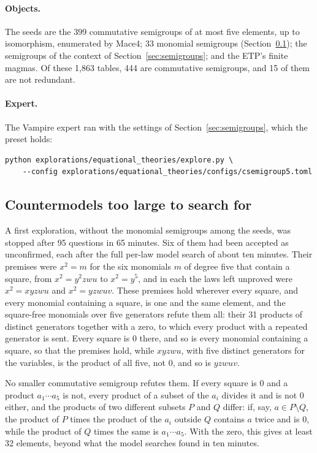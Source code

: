 \documentclass[11pt,a4paper]{article}
\theoremstyle{definition}
\theoremstyle{remark}
\begin{document}
\paragraph{Objects.} The seeds are the 399 commutative semigroups of at most five elements, up to isomorphism, enumerated by Mace4; 33 monomial semigroups (Section~\ref{sec:monomial}); the semigroups of the context of Section~\ref{sec:semigroups}; and the ETP's finite magmas. Of these 1,863 tables, 444 are commutative semigroups, and 15 of them are not redundant.

\paragraph{Expert.} The Vampire expert ran with the settings of Section~\ref{sec:semigroups}, which the preset  holds:
\begin{Verbatim}
python explorations/equational_theories/explore.py \
    --config explorations/equational_theories/configs/csemigroup5.toml
\end{Verbatim}

\subsection{Countermodels too large to search for}\label{sec:monomial}

A first exploration, without the monomial semigroups among the seeds, was stopped after 95 questions in 65 minutes. Six of them had been accepted as unconfirmed, each after the full per-law model search of about ten minutes. Their premises were $x^2 = m$ for the six monomials $m$ of degree five that contain a square, from $x^2 = y^2zwu$ to $x^2 = y^5$, and in each the laws left unproved were $x^2 = xyzwu$ and $x^2 = yzwuv$. These premises hold wherever every square, and every monomial containing a square, is one and the same element, and the square-free monomials over five generators refute them all: their 31 products of distinct generators together with a zero, to which every product with a repeated generator is sent. Every square is $0$ there, and so is every monomial containing a square, so that the premises hold, while $xyzwu$, with five distinct generators for the variables, is the product of all five, not $0$, and so is $yzwuv$.

No smaller commutative semigroup refutes them. If every square is $0$ and a product $a_1 \cdots a_5$ is not, every product of a subset of the $a_i$ divides it and is not $0$ either, and the products of two different subsets $P$ and $Q$ differ: if, say, $a \in P \setminus Q$, the product of $P$ times the product of the $a_i$ outside $Q$ contains $a$ twice and is $0$, while the product of $Q$ times the same is $a_1 \cdots a_5$. With the zero, this gives at least 32 elements, beyond what the model searches found in ten minutes.
\end{document}

